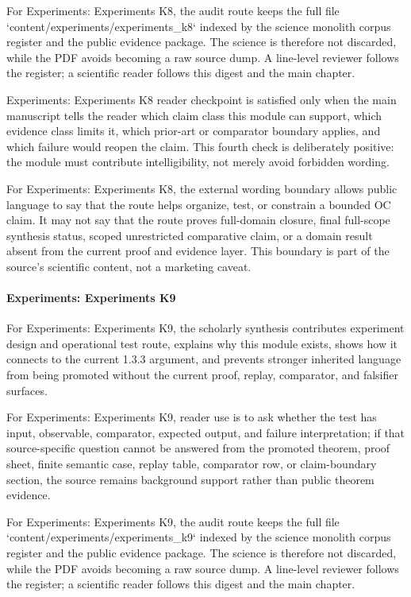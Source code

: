 For Experiments: Experiments K8, the audit route keeps the full file `content/experiments/experiments\_k8` indexed by the science monolith corpus register and the public evidence package. The science is therefore not discarded, while the PDF avoids becoming a raw source dump. A line-level reviewer follows the register; a scientific reader follows this digest and the main chapter.


Experiments: Experiments K8 reader checkpoint is satisfied only when the main manuscript tells the reader which claim class this module can support, which evidence class limits it, which prior-art or comparator boundary applies, and which failure would reopen the claim. This fourth check is deliberately positive: the module must contribute intelligibility, not merely avoid forbidden wording.


For Experiments: Experiments K8, the external wording boundary allows public language to say that the route helps organize, test, or constrain a bounded OC claim. It may not say that the route proves full-domain closure, final full-scope synthesis status, scoped unrestricted comparative claim, or a domain result absent from the current proof and evidence layer. This boundary is part of the source's scientific content, not a marketing caveat.


\paragraph{Experiments: Experiments K9}

For Experiments: Experiments K9, the scholarly synthesis contributes experiment design and operational test route, explains why this module exists, shows how it connects to the current 1.3.3 argument, and prevents stronger inherited language from being promoted without the current proof, replay, comparator, and falsifier surfaces.


For Experiments: Experiments K9, reader use is to ask whether the test has input, observable, comparator, expected output, and failure interpretation; if that source-specific question cannot be answered from the promoted theorem, proof sheet, finite semantic case, replay table, comparator row, or claim-boundary section, the source remains background support rather than public theorem evidence.


For Experiments: Experiments K9, the audit route keeps the full file `content/experiments/experiments\_k9` indexed by the science monolith corpus register and the public evidence package. The science is therefore not discarded, while the PDF avoids becoming a raw source dump. A line-level reviewer follows the register; a scientific reader follows this digest and the main chapter.


